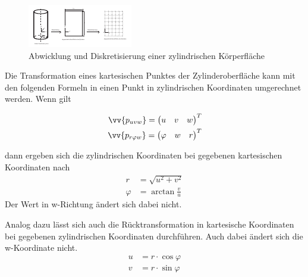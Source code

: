 \begin{figure}[h]
	\centering
	
	\includegraphics[width=\linewidth]{img/discretzylinder.pdf}
	
	\caption{Abwicklung und Diskretisierung einer zylindrischen Körperfläche}
	\label{fig:discretzylinder}
	
\end{figure}

Die Transformation eines kartesischen Punktes der Zylinderoberfläche kann mit den folgenden Formeln in einen Punkt in zylindrischen Koordinaten umgerechnet werden.
Wenn gilt 
\begin{singlespace}
 \begin{equation}
 	\begin{aligned}
	 	\vv{p_{uvw}} = \begin{pmatrix}
	 	u & v & w
	 	\end{pmatrix}^T \\
	 	\vv{p_{r\varphi w}} = \begin{pmatrix}
	 	\varphi & w & r
	 	\end{pmatrix}^T	 	 	
	 \end{aligned}
 \end{equation}
\end{singlespace}
dann ergeben sich die zylindrischen Koordinaten bei gegebenen kartesischen Koordinaten nach
\begin{equation}	
	\begin{aligned}
		r &= \sqrt{u^2 + v^2} \\
		\varphi &= {\arctan{\frac{v}{u}}}
	\end{aligned}	
\end{equation}
Der Wert in w-Richtung ändert sich dabei nicht.

Analog dazu lässt sich auch die Rücktransformation in kartesische Koordinaten bei gegebenen zylindrischen Koordinaten durchführen. Auch dabei ändert sich die w-Koordinate nicht.
\begin{equation}\label{eq:cyl2uvw}	
	\begin{aligned}
		u &= r \cdot \cos{\varphi}  \\
		v &= r \cdot \sin{\varphi}
	\end{aligned}	
\end{equation}


